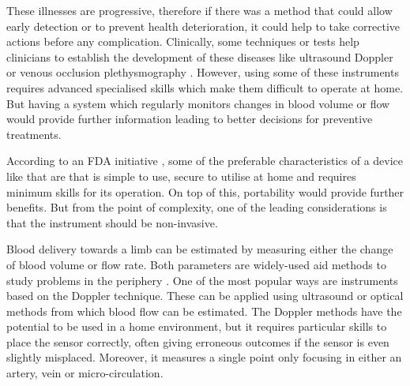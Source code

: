 These illnesses are progressive, therefore if there was a method that could allow early detection or to prevent health deterioration, it could help to take corrective actions before any complication. Clinically, some techniques or tests help clinicians to establish the development of these diseases like ultrasound Doppler \cite{casey2008measuring} or venous occlusion plethysmography \cite{wilkinson2001venous}. However, using some of these instruments requires advanced specialised skills which make them difficult to operate at home. But having a system which regularly monitors changes in blood volume or flow would provide further information leading to better decisions for preventive treatments. 

According to an FDA initiative \cite{fdaini}, some of the preferable characteristics of a device like that are that is simple to use, secure to utilise at home and requires minimum skills for its operation. On top of this, portability would provide further benefits. But from the point of complexity, one of the leading considerations is that the instrument should be non-invasive. 

Blood delivery towards a limb can be estimated by measuring either the change of blood volume or flow rate. Both parameters are widely-used aid methods to study problems in the periphery \cite{orchard1993assessment, hirsch2001peripheral}. One of the most popular ways are instruments based on the Doppler technique. These can be applied using ultrasound \cite{orekhova2013doppler} or optical \cite{fredriksson2007laser} methods from which blood flow can be estimated. The Doppler methods have the potential to be used in a home environment, but it requires particular skills to place the sensor correctly, often giving erroneous outcomes if the sensor is even slightly misplaced. Moreover, it measures a single point only focusing in either an artery, vein or micro-circulation. 

